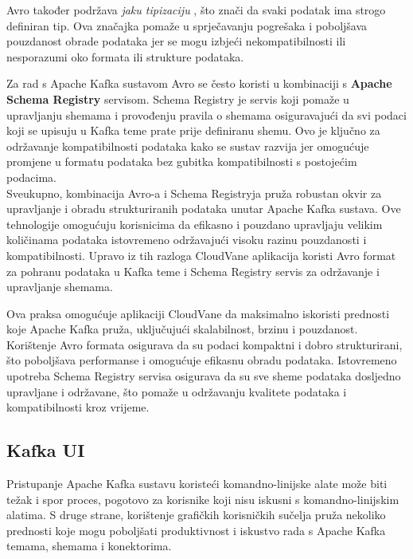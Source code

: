 \documentclass[times, utf8, diplomski]{fer}
\begin{document}
Avro također podržava \emph{jaku tipizaciju} , što znači da svaki podatak ima strogo definiran tip. Ova značajka pomaže u sprječavanju pogrešaka i poboljšava pouzdanost obrade podataka jer se mogu izbjeći nekompatibilnosti ili nesporazumi oko formata ili strukture podataka.

Za rad s Apache Kafka sustavom Avro se često koristi u kombinaciji s \textbf{Apache Schema Registry} servisom. Schema Registry je servis koji pomaže u upravljanju shemama i provođenju pravila o shemama osiguravajući da svi podaci koji se upisuju u Kafka teme prate prije definiranu shemu. Ovo je ključno za održavanje kompatibilnosti podataka kako se sustav razvija jer omogućuje promjene u formatu podataka bez gubitka kompatibilnosti s postojećim podacima. \\

Sveukupno, kombinacija Avro-a i Schema Registryja pruža robustan okvir za upravljanje i obradu strukturiranih podataka unutar Apache Kafka sustava. Ove tehnologije omogućuju korisnicima da efikasno i pouzdano upravljaju velikim količinama podataka istovremeno održavajući visoku razinu pouzdanosti i kompatibilnosti. Upravo iz tih razloga CloudVane aplikacija koristi Avro format za pohranu podataka u Kafka teme i Schema Registry servis za održavanje i upravljanje shemama.

Ova praksa omogućuje aplikaciji CloudVane da maksimalno iskoristi prednosti koje Apache Kafka pruža, uključujući skalabilnost, brzinu i pouzdanost. Korištenje Avro formata osigurava da su podaci kompaktni i dobro strukturirani, što poboljšava performanse i omogućuje efikasnu obradu podataka. Istovremeno upotreba Schema Registry servisa osigurava da su sve sheme podataka dosljedno upravljane i održavane, što pomaže u održavanju kvalitete podataka i kompatibilnosti kroz vrijeme.

\subsection{Kafka UI}
\label{sec:kafka-ui}

Pristupanje Apache Kafka sustavu koristeći komandno-linijske alate  može biti težak i spor proces, pogotovo za korisnike koji nisu iskusni s komandno-linijskim alatima. S druge strane, korištenje grafičkih korisničkih sučelja  pruža nekoliko prednosti koje mogu poboljšati produktivnost i iskustvo rada s Apache Kafka temama, shemama i konektorima.
\end{document}
